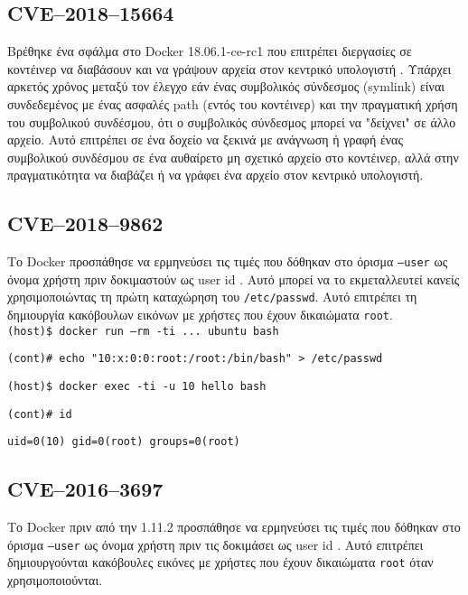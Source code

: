 \subsection{\textlatin{CVE–2018–15664}}

Βρέθηκε ένα σφάλμα στο \textlatin{Docker 18.06.1-ce-rc1} που επιτρέπει
διεργασίες σε κοντέινερ να διαβάσουν και να γράψουν αρχεία στον κεντρικό
υπολογιστή \cite{CVE-2018-15664-Openwall} \cite{CVE-2018-15664-Bugzilla}.
Υπάρχει αρκετός χρόνος μεταξύ τον έλεγχο εάν ένας συμβολικός σύνδεσμος
(\textlatin{symlink}) είναι συνδεδεμένος με ένας ασφαλές \textlatin{path} (εντός
του κοντέινερ) και την πραγματική χρήση του συμβολικού συνδέσμου, ότι ο
συμβολικός σύνδεσμος μπορεί να "δείχνει" σε άλλο αρχείο. Αυτό επιτρέπει σε ένα
δοχείο να ξεκινά με ανάγνωση ή γραφή ένας συμβολικού συνδέσμου σε ένα αυθαίρετο
μη σχετικό αρχείο στο κοντέινερ, αλλά στην πραγματικότητα
να διαβάζει ή να γράφει ένα αρχείο στον κεντρικό υπολογιστή.

\subsection{\textlatin{CVE–2018–9862}}

Το \textlatin{Docker} προσπάθησε να ερμηνεύσει τις τιμές που δόθηκαν στο όρισμα
\texttt{\textlatin{--user}} ως όνομα χρήστη πριν δοκιμαστούν ως \textlatin{user
id} \cite{CVE-2018-9862-Github}. Αυτό μπορεί να το εκμεταλλευτεί κανείς
χρησιμοποιώντας τη πρώτη καταχώρηση του \texttt{\textlatin{/etc/passwd}}. Αυτό
επιτρέπει τη δημιουργία κακόβουλων εικόνων με χρήστες που έχουν δικαιώματα
\texttt{\textlatin{root}}. \\

\texttt{\textlatin{(host)\$ docker run --rm -ti ... ubuntu bash}}

\texttt{\textlatin{(cont)\# echo "10:x:0:0:root:/root:/bin/bash" > /etc/passwd}}

\texttt{\textlatin{(host)\$ docker exec -ti -u 10 hello bash}}

\texttt{\textlatin{(cont)\# id}}

\texttt{\textlatin{uid=0(10) gid=0(root) groups=0(root)}} \\

\subsection{\textlatin{CVE–2016–3697}}

Το \textlatin{Docker} πριν από την 1.11.2 προσπάθησε να ερμηνεύσει τις τιμές που
δόθηκαν στο όρισμα \texttt{\textlatin{--user}} ως όνομα χρήστη πριν τις
δοκιμάσει ως \textlatin{user id} \cite{CVE-2016-3697-Github}. Αυτό επιτρέπει
δημιουργούνται κακόβουλες εικόνες με χρήστες που έχουν δικαιώματα
\texttt{\textlatin{root}} όταν χρησιμοποιούνται. \\

